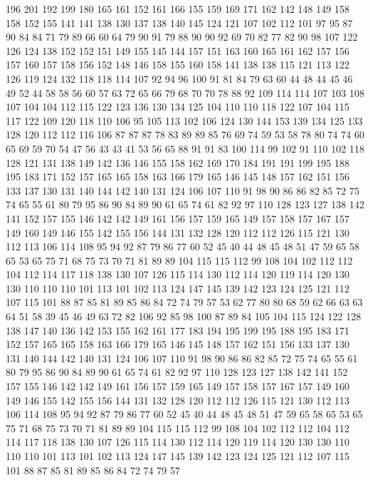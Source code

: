 196 201 192 199 180 165 161 152 161 166 155 159 169 171 162 142 148 149 158 158
152 155 141 141 138 130 137 138 140 145 124 121 107 102 112 101 97 95 87 90
84 84 71 79 89 66 60 64 79 90 91 79 88 90 90 92 69 70 82 77
82 90 98 107 122 126 124 138 152 152 151 149 155 145 144 157 151 163 160 165
161 162 157 156 157 160 157 158 156 152 148 146 158 155 160 158 141 138 138 115
121 113 122 126 119 124 132 118 118 114 107 92 94 96 100 91 81 84 79 63
60 44 48 44 45 46 49 52 44 58 58 56 60 57 63 72 65 66 79 68
70 70 78 88 92 109 114 114 107 103 108 107 104 104 112 115 122 123 136 130
134 125 104 110 110 118 122 107 104 115 117 122 109 120 118 110 106 95 105 113
102 106 124 130 144 153 139 134 125 133 128 120 112 112 116 106 87 87 87 78
83 89 89 85 76 69 74 59 53 58 78 80 74 74 60 65 69 59 70 54
47 56 43 43 41 53 56 65 88 91 91 83 100 114 99 102 91 110 102 118
128 121 131 138 149 142 136 146 155 158 162 169 170 184 191 191 199 195 188 195
183 171 152 157 165 165 158 163 166 179 165 146 145 148 157 162 151 156 133 137
130 131 140 144 142 140 131 124 106 107 110 91 98 90 86 86 82 85 72 75
74 65 55 61 80 79 95 86 90 84 89 90 61 65 74 61 82 92 97 110
128 123 127 138 142 141 152 157 155 146 142 142 149 161 156 157 159 165 149 157
158 157 167 157 149 160 149 146 155 142 155 156 144 131 132 128 120 112 112 126
115 121 130 112 113 106 114 108 95 94 92 87 79 86 77 60 52 45 40 44
48 45 48 51 47 59 65 58 65 53 65 75 71 68 75 73 70 71 81 89
89 104 115 115 112 99 108 104 102 112 112 104 112 114 117 118 138 130 107 126
115 114 130 112 114 120 119 114 120 130 130 110 110 110 101 113 101 102 113 124
147 145 139 142 123 124 125 121 112 107 115 101 88 87 85 81 89 85 86 84
72 74 79 57 53 62 77 80 80 68 59 62 66 63 63 64 51 58 39 45
46 49 63 72 82 106 92 85 98 100 87 89 84 105 104 115 124 122 128 138
147 140 136 142 153 155 162 161 177 183 194 195 199 195 188 195 183 171 152 157
165 165 158 163 166 179 165 146 145 148 157 162 151 156 133 137 130 131 140 144
142 140 131 124 106 107 110 91 98 90 86 86 82 85 72 75 74 65 55 61
80 79 95 86 90 84 89 90 61 65 74 61 82 92 97 110 128 123 127 138
142 141 152 157 155 146 142 142 149 161 156 157 159 165 149 157 158 157 167 157
149 160 149 146 155 142 155 156 144 131 132 128 120 112 112 126 115 121 130 112
113 106 114 108 95 94 92 87 79 86 77 60 52 45 40 44 48 45 48 51
47 59 65 58 65 53 65 75 71 68 75 73 70 71 81 89 89 104 115 115
112 99 108 104 102 112 112 104 112 114 117 118 138 130 107 126 115 114 130 112
114 120 119 114 120 130 130 110 110 110 101 113 101 102 113 124 147 145 139 142
123 124 125 121 112 107 115 101 88 87 85 81 89 85 86 84 72 74 79 57
